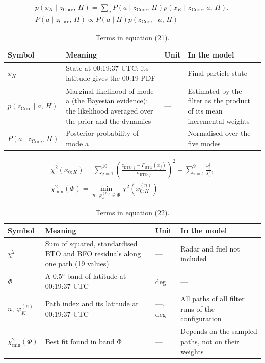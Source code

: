\begin{multline}
p\left(x_{K} \mid z_{\mathrm{Core}},\, H\right) = \sum_{a} P\left(a \mid z_{\mathrm{Core}},\, H\right) p\left(x_{K} \mid z_{\mathrm{Core}},\, a,\, H\right), \\ P\left(a \mid z_{\mathrm{Core}},\, H\right) \propto P\left(a \mid H\right) p\left(z_{\mathrm{Core}} \mid a,\, H\right)
\label{eq:21}
\end{multline}
\begin{table}[h]
\caption{Terms in equation (21).}
\small
\begin{tabular}{p{2.4cm}p{4.6cm}p{1.1cm}p{4.0cm}}
\hline
Symbol & Meaning & Unit & In the model \\
\hline
$x_{K}$ & State at 00:19:37 UTC; its latitude gives the 00:19 PDF & — & Final particle state \\
$p(z_{\mathrm{Core}} \mid a,\, H)$ & Marginal likelihood of mode a (the Bayesian evidence): the likelihood averaged over the prior and the dynamics & — & Estimated by the filter as the product of its mean incremental weights \\
$P(a \mid z_{\mathrm{Core}},\, H)$ & Posterior probability of mode a & — & Normalised over the five modes \\
\hline
\end{tabular}
\end{table}

\begin{multline}
\chi^{2}\left(x_{0:K}\right) = \sum_{j=1}^{10} \left(\frac{z_{\mathrm{BTO},j} - F_{\mathrm{BTO}}\left(x_{j}\right)}{\sigma_{\mathrm{BTO},j}}\right)^{2} + \sum_{i=1}^{9} \frac{\nu_{i}^{2}}{s_{i}^{2}}, \\ \chi_{\min}^{2}(\Phi) = \min_{n:\ \varphi_{K}^{(n)} \in \Phi} \chi^{2}\left(x_{0:K}^{(n)}\right)
\label{eq:22}
\end{multline}
\begin{table}[h]
\caption{Terms in equation (22).}
\small
\begin{tabular}{p{2.4cm}p{4.6cm}p{1.1cm}p{4.0cm}}
\hline
Symbol & Meaning & Unit & In the model \\
\hline
$\chi^{2}$ & Sum of squared, standardised BTO and BFO residuals along one path (19 values) & — & Radar and fuel not included \\
$\Phi$ & A 0.5° band of latitude at 00:19:37 UTC & deg & — \\
$n,\ \varphi_{K}^{(n)}$ & Path index and its latitude at 00:19:37 UTC & —, deg & All paths of all filter runs of the configuration \\
$\chi_{\min}^{2}(\Phi)$ & Best fit found in band Φ & — & Depends on the sampled paths, not on their weights \\
\hline
\end{tabular}
\end{table}

